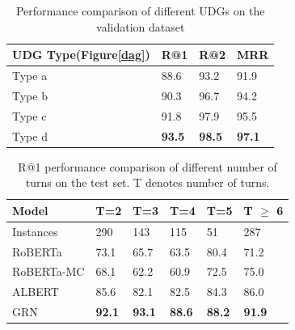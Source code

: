 \documentclass[letterpaper]{article}
\begin{document}
\begin{table}[t]
\centering
\begin{adjustbox}{width=0.85\columnwidth}
\begin{tabular}{l|l|l|l}
\hline
   UDG Type(Figure\ref{dag}) & R@1 & R@2 & MRR \\  \hline
   Type a  & 88.6 & 93.2 & 91.9  \\
   Type b  & 90.3 & 96.7 & 94.2  \\
   Type c  & 91.8 & 97.9 & 95.5  \\
   Type d & \textbf{93.5} & \textbf{98.5} & \textbf{97.1}  \\ \hline

\end{tabular}
\end{adjustbox}
\caption{Performance comparison of different UDGs on the validation dataset}
\label{dag_result}
\end{table}

\begin{table}[t]
\centering
\begin{adjustbox}{width=0.78\columnwidth}
\begin{tabular}{l|l|l|l|l|l}
     \hline
      Model & T=2 & T=3 & T=4 & T=5 & T $\geq$ 6  \\ \hline
     Instances & 290 & 143 & 115 & 51 & 287  \\
     RoBERTa & 73.1 & 65.7 & 63.5 & 80.4 & 71.2  \\
     RoBERTa-MC & 68.1 & 62.2 & 60.9 & 72.5 & 75.0  \\
     ALBERT & 85.6 & 82.1 & 82.5 & 84.3 & 86.0  \\
     GRN & \textbf{92.1} & \textbf{93.1} & \textbf{88.6} & \textbf{88.2} & \textbf{91.9} \\  \hline
\end{tabular}
\end{adjustbox}
\caption{R@1 performance comparison of different number of turns on the test set. T denotes number of
turns.}
\label{acc_results}
\end{table}
\end{document}
